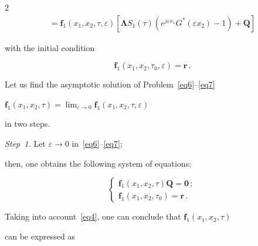 \begin{multicols}{2}
\begin{multline}
\!\!\!\!\!{}=


\mathbf{f}_1(x_1,x_2,\tau,\varepsilon)\!\left[\mathbf{\Lambda} 


S_1(\tau)\left( e^{j\varepsilon x_1}G^*(\varepsilon x_2)\!-\!1\right) +\mathbf{Q}\right]\!\!


\label{eq6}


\end{multline}


with the initial condition


\begin{equation}


\label{eq7}


\mathbf{f}_1(x_1,x_2,\tau_0,\varepsilon)=\mathbf{r}\,.


\end{equation}





Let us find the asymptotic solution of Problem~\eqref{eq6}--\eqref{eq7} 


$\mathbf{f}_1(x_1,x_2,\tau)=


\lim\nolimits_{\varepsilon\to 0}\mathbf{f}_1(x_1, x_2,\tau,\varepsilon)$


in two steps.





\textit{Step~1.} Let $\varepsilon\to 0$ in~\eqref{eq6}--\eqref{eq7}; 


then, one obtains the following system of equations:


$$


\left\{ 


\begin{array}{l}


\mathbf{f}_1\left(x_1,x_2,\tau\right)\mathbf{Q}=\mathbf{0}\,;\\[6pt]


\mathbf{f}_1\left(x_1,x_2,\tau_0\right)=\mathbf{r}\,.


\end{array}


\right.


$$





Taking into account~\eqref{eq4}, one can conclude that $\mathbf{f}_1(x_1,x_2,\tau)$  


can be expressed as


\begin{equation}


\label{eq8}



\end{equation}
\end{multicols}
